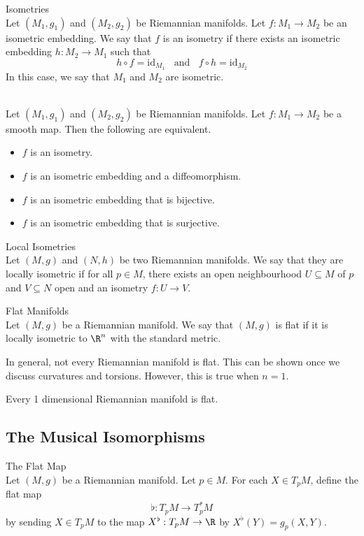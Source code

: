\documentclass[a4paper]{article}
\begin{document}
\begin{defn}{Isometries}{}\\
Let $(M_1,g_1)$ and $(M_2,g_2)$ be Riemannian manifolds. Let $f:M_1\to M_2$ be an isometric embedding. We say that $f$ is an isometry if there exists an isometric embedding $h:M_2\to M_1$ such that $$h\circ f=\text{id}_{M_1}\;\;\text{ and }\;\;f\circ h=\text{id}_{M_2}$$ In this case, we say that $M_1$ and $M_2$ are isometric. 
\end{defn}

\begin{prp}{}{}\\
Let $(M_1,g_1)$ and $(M_2,g_2)$ be Riemannian manifolds. Let $f:M_1\to M_2$ be a smooth map. Then the following are equivalent. 
\begin{itemize}
\item $f$ is an isometry. 
\item $f$ is an isometric embedding and a diffeomorphism. 
\item $f$ is an isometric embedding that is bijective. 
\item $f$ is an isometric embedding that is surjective. 
\end{itemize}
\end{prp}

\begin{defn}{Local Isometries}{}\\
Let $(M,g)$ and $(N,h)$ be two Riemannian manifolds. We say that they are locally isometric if for all $p\in M$, there exists an open neighbourhood $U\subseteq M$ of $p$ and $V\subseteq N$ open and an isometry $f:U\to V$. 
\end{defn}

\begin{defn}{Flat Manifolds}{}\\
Let $(M,g)$ be a Riemannian manifold. We say that $(M,g)$ is flat if it is locally isometric to $\R^n$ with the standard metric. 
\end{defn}

In general, not every Riemannian manifold is flat. This can be shown once we discuss curvatures and torsions. However, this is true when $n=1$. 

\begin{lmm}{}{} Every 1 dimensional Riemannian manifold is flat. 
\end{lmm}

\subsection{The Musical Isomorphisms}
\begin{defn}{The Flat Map}{}\\
Let $(M,g)$ be a Riemannian manifold. Let $p\in M$. For each $X\in T_pM$, define the flat map $$\flat:T_pM\to T_p^\ast M$$ by sending $X\in T_pM$ to the map $X^\flat:T_pM\to\R$ by $X^\flat(Y)=g_p(X,Y)$. 
\end{defn}
\end{document}

